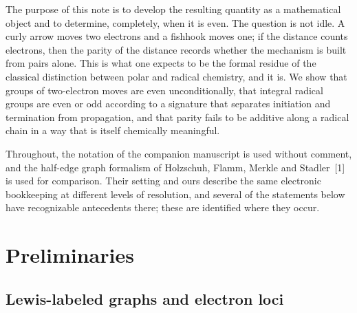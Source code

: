 \documentclass[11pt]{article}
\numberwithin{equation}{section}
\theoremstyle{plain}
\theoremstyle{definition}
\theoremstyle{remark}
\begin{document}
The purpose of this note is to develop the resulting quantity as a
mathematical object and to determine, completely, when it is even.  The
question is not idle.  A curly arrow moves two electrons and a fishhook moves
one; if the distance counts electrons, then the parity of the distance records
whether the mechanism is built from pairs alone.  This is what one expects to
be the formal residue of the classical distinction between polar and radical
chemistry, and it is.  We show that groups of two-electron moves are even
unconditionally, that integral radical groups are even or odd according to a
signature that separates initiation and termination from propagation, and that
parity fails to be additive along a radical chain in a way that is itself
chemically meaningful.

Throughout, the notation of the companion manuscript is used without
comment, and the half-edge graph formalism of Holzschuh, Flamm, Merkle and
Stadler~[1] is used for comparison.  Their setting and ours describe the same
electronic bookkeeping at different levels of resolution, and several of the
statements below have recognizable antecedents there; these are identified
where they occur.

\section{Preliminaries}
\label{sec:prelim}

\subsection{Lewis-labeled graphs and electron loci}
\end{document}
